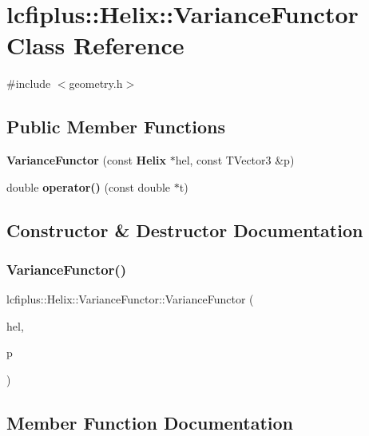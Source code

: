 \section{lcfiplus\+:\+:Helix\+:\+:Variance\+Functor Class Reference}
\label{classlcfiplus_1_1Helix_1_1VarianceFunctor}


{\ttfamily \#include $<$geometry.\+h$>$}

\subsection*{Public Member Functions}
\begin{DoxyCompactItemize}
\item 
\textbf{ Variance\+Functor} (const \textbf{ Helix} $\ast$hel, const T\+Vector3 \&p)
\item 
double \textbf{ operator()} (const double $\ast$t)
\end{DoxyCompactItemize}


\subsection{Constructor \& Destructor Documentation}
\mbox{\label{classlcfiplus_1_1Helix_1_1VarianceFunctor_a279a6d39ab2fe55b23d906aeee5b198b}} 
\subsubsection{Variance\+Functor()}
{\footnotesize\ttfamily lcfiplus\+::\+Helix\+::\+Variance\+Functor\+::\+Variance\+Functor (\begin{DoxyParamCaption}\item[{const \textbf{ Helix} $\ast$}]{hel,  }\item[{const T\+Vector3 \&}]{p }\end{DoxyParamCaption})\hspace{0.3cm}{\ttfamily [inline]}}



\subsection{Member Function Documentation}
\mbox{\label{classlcfiplus_1_1Helix_1_1VarianceFunctor_a580f59a5bdf8afe8e7ae625163cabdea}} 
